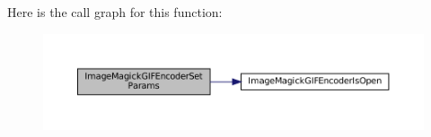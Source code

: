 Here is the call graph for this function\+:
\nopagebreak
\begin{figure}[H]
\begin{center}
\leavevmode
\includegraphics[width=350pt]{imagemagick-gif-encoder_8h_a40b53230d8a8b3b36048085d06d9d029_cgraph}
\end{center}
\end{figure}
